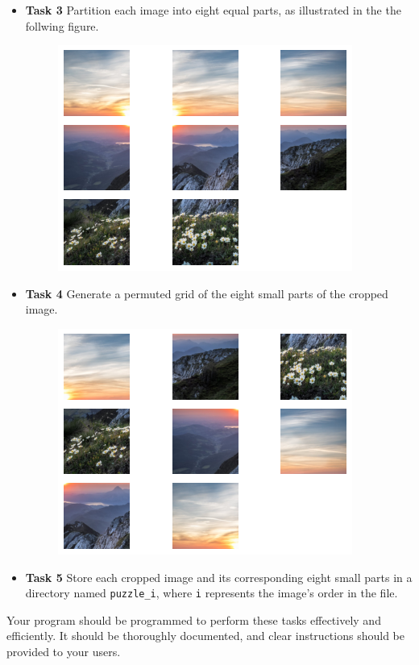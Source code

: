 \begin{itemize}
\item \textbf{Task 3} Partition each image into eight equal parts, as
  illustrated in the the follwing figure.

\begin{figure}[H]
\centering
\includegraphics[scale=.5]{image_order.png}
\end{figure}


\item \textbf{Task 4} Generate a permuted grid of the eight small parts of the cropped image.

\begin{figure}[H]
\centering
\includegraphics[scale=.5]{image_slides.png}
\end{figure}

\item \textbf{Task 5} Store each cropped image and its corresponding eight small parts in a directory named \verb|puzzle_i|, where \verb|i| represents the image's order in the file.
\end{itemize}

Your program should be programmed to perform these tasks effectively and
efficiently. It should be thoroughly documented, and clear instructions
should be provided to your users.
\newpage